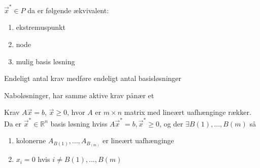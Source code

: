     

\begin{stn}
$\vec{x}^* \in P$ da er følgende ækvivalent:
\begin{enumerate}[label=(\alph*)]
\item ekstremuspunkt
 \item node
 \item mulig basis løsning
\end{enumerate}
\end{stn}


\begin{cor}
Endeligt antal krav medføre endeligt antal basisløsninger
\end{cor}

\begin{defn}[Naboløsninger]
Naboløsninger, har samme aktive krav pånær et
\end{defn}

\begin{stn}
Krav $A\vec{x}=b$, $\vec{x}\geq 0$, hvor $A$ er $m\times n$ matrix med lineært uafhænginge rækker. Da er $\vec{x}^*\in \mathds{R}^n$  basis løsning hviss $A\vec{x}^*=b, \vec{x}^* \geq 0$, og der $\exists B(1), ..., B(m)$ så
\begin{enumerate}[label=(\alph*)]
\item kolonerne $A_{B(1)}, ..., A_{B_(m)}$ er lineært uafhænginge
\item $x_i = 0$ hvis $i \neq B(1),...,B(m)$
\end{enumerate}
\end{stn}
